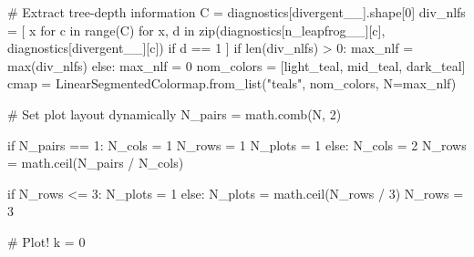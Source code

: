 \documentclass[
  letterpaper,
  DIV=11,
  numbers=noendperiod]{scrartcl}
\newenvironment{Shaded}{\begin{snugshade}}{\end{snugshade}}
\newcommand{\BuiltInTok}[1]{\textcolor[rgb]{0.00,0.23,0.31}{#1}}
\newcommand{\CommentTok}[1]{\textcolor[rgb]{0.37,0.37,0.37}{#1}}
\newcommand{\ControlFlowTok}[1]{\textcolor[rgb]{0.00,0.23,0.31}{#1}}
\newcommand{\DecValTok}[1]{\textcolor[rgb]{0.68,0.00,0.00}{#1}}
\newcommand{\KeywordTok}[1]{\textcolor[rgb]{0.00,0.23,0.31}{#1}}
\newcommand{\NormalTok}[1]{\textcolor[rgb]{0.00,0.23,0.31}{#1}}
\newcommand{\OperatorTok}[1]{\textcolor[rgb]{0.37,0.37,0.37}{#1}}
\newcommand{\StringTok}[1]{\textcolor[rgb]{0.13,0.47,0.30}{#1}}
\begin{document}
\begin{Shaded}
\begin{Highlighting}[]
  \CommentTok{\# Extract tree{-}depth information}
\NormalTok{  C }\OperatorTok{=}\NormalTok{ diagnostics[}\StringTok{\textquotesingle{}divergent\_\_\textquotesingle{}}\NormalTok{].shape[}\DecValTok{0}\NormalTok{]}
\NormalTok{  div\_nlfs }\OperatorTok{=}\NormalTok{ [ x }\ControlFlowTok{for}\NormalTok{ c }\KeywordTok{in} \BuiltInTok{range}\NormalTok{(C) }
                 \ControlFlowTok{for}\NormalTok{ x, d }\KeywordTok{in} \BuiltInTok{zip}\NormalTok{(diagnostics[}\StringTok{\textquotesingle{}n\_leapfrog\_\_\textquotesingle{}}\NormalTok{][c],}
\NormalTok{                                 diagnostics[}\StringTok{\textquotesingle{}divergent\_\_\textquotesingle{}}\NormalTok{][c])}
                 \ControlFlowTok{if}\NormalTok{ d }\OperatorTok{==} \DecValTok{1}\NormalTok{  ]}
  \ControlFlowTok{if} \BuiltInTok{len}\NormalTok{(div\_nlfs) }\OperatorTok{\textgreater{}} \DecValTok{0}\NormalTok{:}
\NormalTok{    max\_nlf }\OperatorTok{=} \BuiltInTok{max}\NormalTok{(div\_nlfs)}
  \ControlFlowTok{else}\NormalTok{:}
\NormalTok{    max\_nlf }\OperatorTok{=} \DecValTok{0}
\NormalTok{  nom\_colors }\OperatorTok{=}\NormalTok{ [light\_teal, mid\_teal, dark\_teal]}
\NormalTok{  cmap }\OperatorTok{=}\NormalTok{ LinearSegmentedColormap.from\_list(}\StringTok{"teals"}\NormalTok{, nom\_colors, }
\NormalTok{                                                    N}\OperatorTok{=}\NormalTok{max\_nlf)}
  
  \CommentTok{\# Set plot layout dynamically}
\NormalTok{  N\_pairs }\OperatorTok{=}\NormalTok{ math.comb(N, }\DecValTok{2}\NormalTok{)}
  
  \ControlFlowTok{if}\NormalTok{ N\_pairs }\OperatorTok{==} \DecValTok{1}\NormalTok{:}
\NormalTok{    N\_cols }\OperatorTok{=} \DecValTok{1}
\NormalTok{    N\_rows }\OperatorTok{=} \DecValTok{1}
\NormalTok{    N\_plots }\OperatorTok{=} \DecValTok{1}
  \ControlFlowTok{else}\NormalTok{:}
\NormalTok{    N\_cols }\OperatorTok{=} \DecValTok{2}
\NormalTok{    N\_rows }\OperatorTok{=}\NormalTok{ math.ceil(N\_pairs }\OperatorTok{/}\NormalTok{ N\_cols)}
    
  \ControlFlowTok{if}\NormalTok{ N\_rows }\OperatorTok{\textless{}=} \DecValTok{3}\NormalTok{:}
\NormalTok{    N\_plots }\OperatorTok{=} \DecValTok{1}
  \ControlFlowTok{else}\NormalTok{:}
\NormalTok{    N\_plots }\OperatorTok{=}\NormalTok{ math.ceil(N\_rows }\OperatorTok{/} \DecValTok{3}\NormalTok{)}
\NormalTok{    N\_rows }\OperatorTok{=} \DecValTok{3}
    
  \CommentTok{\# Plot!}
\NormalTok{  k }\OperatorTok{=} \DecValTok{0}
  

\end{Highlighting}
\end{Shaded}
\end{document}
